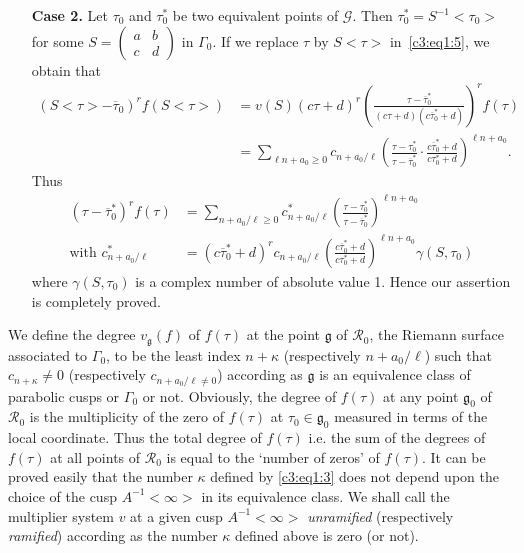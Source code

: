 \begin{itemize}
\item[{\textbf{Case 2.}}] Let $\tau_0$ and $\tau^{\ast}_0$ be two
  equivalent points of $\mathscr{G}$. Then
  $\tau^{\ast}_0=S^{-1}<\tau_0>$ for some
  $S=\left(\begin{smallmatrix} a&b\\c&d \end{smallmatrix} \right)$ in
  $\Gamma_0$. If we replace $\tau$ by $S<\tau>$ in~\eqref{c3:eq1:5}, we obtain that
\begin{align*}
(S<\tau>-\overline{\tau}_0)^r f(S<\tau>) & = v(S)
  (c\tau+d)^r \left(\frac{\tau-\overline{\tau}^{\ast}_0}
  {(c\tau+d)(c\overline{\tau}^{\ast}_0+d)}\right)^r f(\tau)   \\
& = \sum_{\ell n+a_0\geq 0} c_{n+a_0/\ell}
  \left(\frac{\tau-\tau^{\ast}_0}{\tau - \overline{\tau}^{\ast}_0}
  \cdot \frac{c\overline{\tau}^{\ast}_0
    +d}{c\tau^{\ast}_0+d}\right)^{\ell n+a_0}. 
\end{align*}
Thus \pageoriginale
\begin{align*}
(\tau-\overline{\tau}^{\ast}_0)^rf(\tau) & = \sum_{n+a_0/\ell\geq0}
  c^{\ast}_{n+a_0/\ell}
  \left(\frac{\tau-\tau^{\ast}_0}{\tau-\overline{\tau}^{\ast}_0}\right)^{\ell
  n+a_0} \\
\text{with } c^{\ast}_{n+a_0/\ell} & = (c\overline{\tau}^{\ast}_0+d)^r
c_{n+a_0/\ell}
\left(\frac{c\overline{\tau}^{\ast}_0+d}{c\tau^{\ast}_0+d}\right)^{\ell
n+a_0} \gamma(S,\tau_0)
\end{align*}
where $\gamma(S,\tau_0)$ is a complex number of absolute value
1. Hence our assertion is completely proved.
\end{itemize}

We define the degree $v_{\mathfrak{g}}(f)$ of $f(\tau)$ at the point
$\mathfrak{g}$ of $\mathscr{R}_0$, the Riemann surface associated to
$\Gamma_0$, to be the least index $n+\kappa$ (respectively
$n+a_0/\ell$) such that $c_{n+\kappa}\neq 0$ (respectively
$c_{n+a_0/\ell \neq 0}$) according as $\mathfrak{g}$ is an equivalence
class of parabolic cusps or $\Gamma_0$ or not. Obviously, the degree
of $f(\tau)$ at any point $\mathfrak{g}_0$ of $\mathscr{R}_0$ is the
multiplicity of the zero of $f(\tau)$ at $\tau_0\in
\mathfrak{g}_0$ measured in terms of the local coordinate. Thus the
total degree of $f(\tau)$ i.e. the sum of the degrees of $f(\tau)$ at
all points of $\mathscr{R}_0$ is equal to the `number of zeros' of
$f(\tau)$. It can be proved easily that the number $\kappa$ defined by
\eqref{c3:eq1:3} does not depend upon the choice of the cusp $A^{-1}<\infty>$ in
its equivalence class. We shall call the multiplier system $v$ at a
given cusp $A^{-1}<\infty>$ \textit{unramified} (respectively
\textit{ramified}) according as the number $\kappa$ defined above is
zero (or not). 

